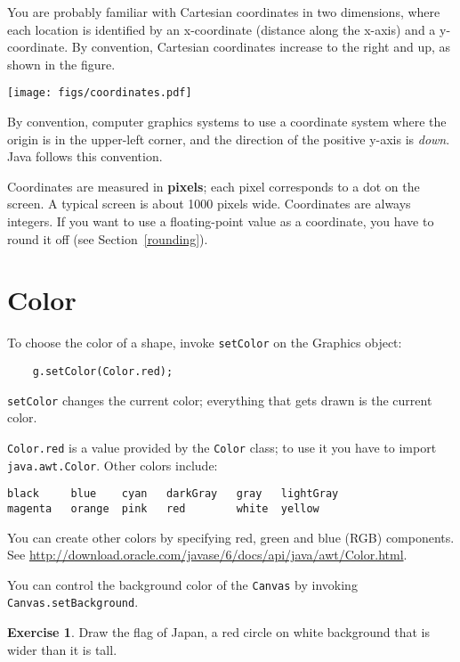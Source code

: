 \documentclass[12pt]{book}
\theoremstyle{definition}
\newtheorem{excz}{Exercise}[chapter]
\newenvironment{exercise}{\bigskip\begin{excz}\mbox{}}{\end{excz}}
\begin{document}
You are probably familiar with Cartesian coordinates in two
dimensions, where each location is identified by an x-coordinate
(distance along the x-axis) and a y-coordinate.  By convention,
Cartesian coordinates increase to the right and up, as shown in the
figure.


\texttt{[image: figs/coordinates.pdf]}


By convention, computer graphics systems to use a
coordinate system where the origin is in the
upper-left corner, and the direction of the
positive y-axis is {\em down}.  Java follows this convention.


Coordinates are measured in {\bf pixels}; each pixel corresponds to
a dot on the screen.  A typical screen is about
1000 pixels wide.  Coordinates are always integers.  If you want to
use a floating-point value as a coordinate, you have to round it off
(see Section~\ref{rounding}).


\section{Color}

To choose the color of a shape, invoke {\tt setColor} on the Graphics
object:

\begin{lstlisting}
    g.setColor(Color.red);
\end{lstlisting}
%
{\tt setColor} changes the current color; everything that gets drawn 
is the current color.

{\tt Color.red} is a value provided by the {\tt Color}
class; to use it you have to import {\tt java.awt.Color}.
Other colors include:

\begin{lstlisting}
black     blue    cyan   darkGray   gray   lightGray
magenta	  orange  pink   red        white  yellow
\end{lstlisting}
%
You can create other colors by specifying red, green and blue (RGB)
components.
See \url{http://download.oracle.com/javase/6/docs/api/java/awt/Color.html}.

You can control the background color of the {\tt Canvas} by
invoking {\tt Canvas.setBackground}.

\begin{exercise}
Draw the flag of Japan, a red circle on white background
that is wider than it is tall.
\end{exercise}
\end{document}
